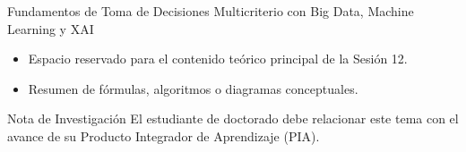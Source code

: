 \documentclass[aspectratio=169, 10pt]{beamer}
\begin{document}
\begin{frame}{Fundamentos de Toma de Decisiones Multicriterio con Big Data, Machine Learning y XAI}
    \begin{itemize}
        \item Espacio reservado para el contenido teórico principal de la Sesión 12.
        \item Resumen de fórmulas, algoritmos o diagramas conceptuales.
    \end{itemize}
    \begin{block}{Nota de Investigación}
        El estudiante de doctorado debe relacionar este tema con el avance de su Producto Integrador de Aprendizaje (PIA).
    \end{block}
\end{frame}
\end{document}
